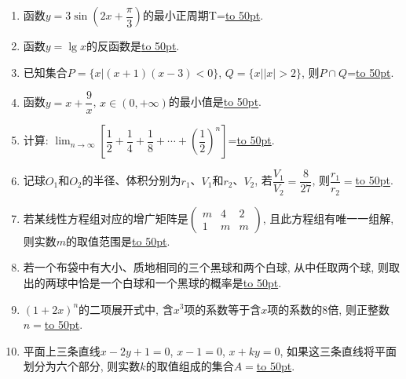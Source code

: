 \documentclass[10pt,a4paper]{article}
\newcommand{\blank}[1]{\underline{\hbox to #1pt{}}}
\begin{document}
\begin{enumerate}[1.]
\item 函数$y=3\sin(2x+\dfrac{\pi}3)$的最小正周期T=\blank{50}.
\item 函数$y=\lg x$的反函数是\blank{50}.
\item 已知集合$P=\{x|(x+1)(x-3)<0\}$, $Q=\{x||x|>2\}$, 则$P\cap Q$=\blank{50}.  
\item 函数$y=x+\dfrac9x$, $x\in (0,+\infty)$的最小值是\blank{50}.
\item 计算: $\displaystyle\lim_{n\to\infty}[\dfrac12+\dfrac14+\dfrac18+\cdots+(\dfrac12)^n]$=\blank{50}.
\item 记球$O_1$和$O_2$的半径、体积分别为$r_1$、$V_1$和$r_2$、$V_2$, 若$\dfrac{V_1}{V_2}=\dfrac8{27}$, 则$\dfrac{r_1}{r_2}=$\blank{50}.
\item 若某线性方程组对应的增广矩阵是$\begin{pmatrix} m & 4 & 2 \\ 1 & m & m \end{pmatrix}$, 且此方程组有唯一一组解, 则实数$m$的取值范围是\blank{50}.  
\item 若一个布袋中有大小、质地相同的三个黑球和两个白球, 从中任取两个球, 则取出的两球中恰是一个白球和一个黑球的概率是\blank{50}.
\item $(1+2x)^n$的二项展开式中, 含$x^3$项的系数等于含$x$项的系数的$8$倍, 则正整数$n=$\blank{50}.
\item 平面上三条直线$x-2y+1=0$, $x-1=0$, $x+ky=0$, 如果这三条直线将平面划分为六个部分, 则实数$k$的取值组成的集合$A=$\blank{50}.



\end{enumerate}
\end{document}
